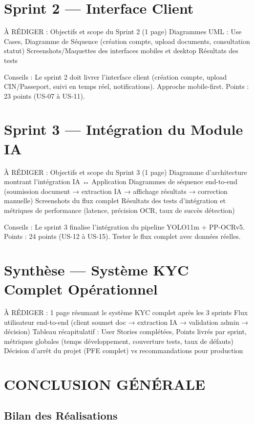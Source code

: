 \section{Sprint 2 --- Interface Client}

À RÉDIGER : Objectifs et scope du Sprint 2 (1 page)
Diagrammes UML : Use Cases, Diagramme de Séquence (création compte, upload documents, consultation statut)
Screenshots/Maquettes des interfaces mobiles et desktop
Résultats des tests

Conseils : Le sprint 2 doit livrer l'interface client (création compte, upload CIN/Passeport, suivi en temps réel, notifications). Approche mobile-first. Points : 23 points (US-07 à US-11).

\section{Sprint 3 --- Intégration du Module IA}

À RÉDIGER : Objectifs et scope du Sprint 3 (1 page)
Diagramme d'architecture montrant l'intégration IA ↔ Application
Diagrammes de séquence end-to-end (soumission document → extraction IA → affichage résultats → correction manuelle)
Screenshots du flux complet
Résultats des tests d'intégration et métriques de performance (latence, précision OCR, taux de succès détection)

Conseils : Le sprint 3 finalise l'intégration du pipeline YOLO11m + PP-OCRv5. Points : 24 points (US-12 à US-15). Tester le flux complet avec données réelles.

\section{Synthèse --- Système KYC Complet Opérationnel}

À RÉDIGER : 1 page résumant le système KYC complet après les 3 sprints
Flux utilisateur end-to-end (client soumet doc → extraction IA → validation admin → décision)
Tableau récapitulatif : User Stories complétées, Points livrés par sprint, métriques globales (temps développement, couverture tests, taux de défauts)
Décision d'arrêt du projet (PFE complet) vs recommandations pour production

\section{CONCLUSION GÉNÉRALE}

\subsection{Bilan des Réalisations}


